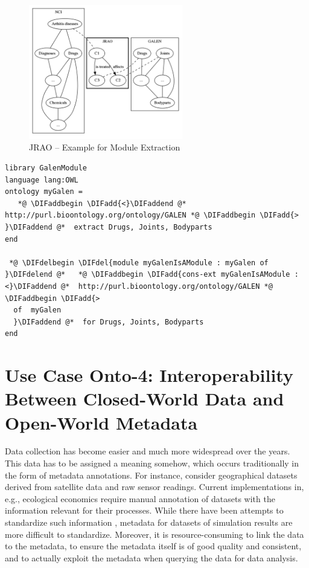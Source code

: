 \documentclass[10pt,fleqn,final]{scrreprt}
\newenvironment{definitions}[0]{\medskip }{}
\providecommand{\DIFadd}[1]{{\protect\color{blue}\uwave{#1}}} %
\providecommand{\DIFdel}[1]{{\protect\color{red}\sout{#1}}}                      %
\providecommand{\DIFaddbegin}{} %
\providecommand{\DIFaddend}{} %
\providecommand{\DIFdelbegin}{} %
\providecommand{\DIFdelend}{} %
\begin{document}
\begin{definitions}
\begin{figure}[htbp]
\begin{center}
\includegraphics[width=0.6\textwidth]{useCaseOnto3.png}
\caption{JRAO  -- Example for Module Extraction}
\label{JRAO}
\end{center}
\end{figure}


 \begin{lstlisting}[basicstyle=\ttfamily,language=dolText,escapechar=@,mathescape]
  %prefix( lang:  <http://purl.net/DOL/languages/> )%
library GalenModule
language lang:OWL
ontology myGalen = 
   *@ \DIFaddbegin \DIFadd{<}\DIFaddend @*  http://purl.bioontology.org/ontology/GALEN *@ \DIFaddbegin \DIFadd{> }\DIFaddend @*  extract Drugs, Joints, Bodyparts
end

 *@ \DIFdelbegin \DIFdel{module myGalenIsAModule : myGalen of }\DIFdelend @*   *@ \DIFaddbegin \DIFadd{cons-ext myGalenIsAModule : <}\DIFaddend @*  http://purl.bioontology.org/ontology/GALEN *@ \DIFaddbegin \DIFadd{>
  of  myGalen 
  }\DIFaddend @*  for Drugs, Joints, Bodyparts
end
\end{lstlisting}



\section{Use Case Onto-4: Interoperability Between Closed-World Data and Open-World Metadata}
Data collection has become easier and much more widespread over the years. This data has to be 
assigned a meaning somehow, which occurs traditionally in the  form of metadata annotations. For 
instance, consider geographical datasets derived from satellite data and raw sensor readings. 
Current implementations in, e.g., ecological economics \cite{bagstad_aries_2011} require manual 
annotation of datasets with the information relevant for their processes. While there have been 
attempts to standardize such information \cite{european_comission_inspire_2014}, metadata for 
datasets of simulation results are more difficult to standardize. Moreover, it is 
resource-consuming to link the data to the metadata, to ensure the metadata itself is of good 
quality and consistent, and to actually exploit the metadata when querying the data for data 
analysis. 


\end{definitions}
\end{document}

